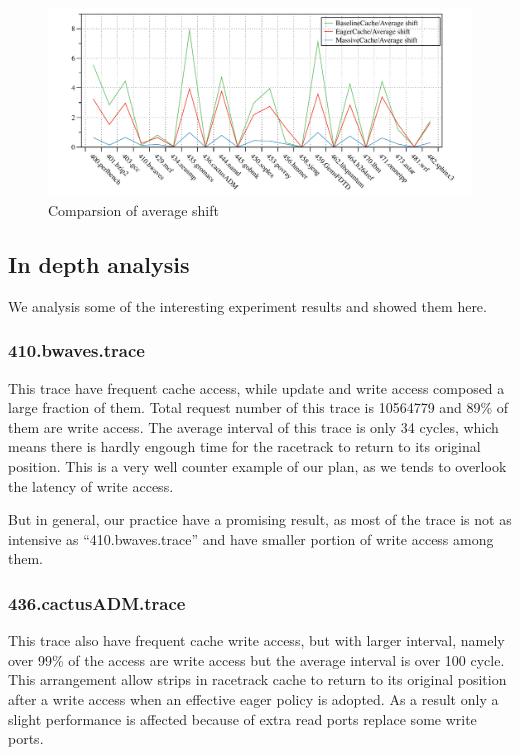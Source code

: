 \documentclass[11pt]{article}
\begin{document}
\begin{figure}
\centering
\includegraphics[width=400pt]{con2.pdf}
\caption{Comparsion of average shift}
\label{fig:con2}
\end{figure}

\subsection{In depth analysis}
We analysis some of the interesting experiment results and showed them here.

\subsubsection{410.bwaves.trace}

This trace have frequent cache access, while update and write access composed a large fraction of them. Total request number of this trace is 10564779 and 89\% of them are write access. The average interval of this trace is only 34 cycles, which means there is hardly engough time for the racetrack to return to its original position. This is a very well counter example of our plan, as we tends to overlook the latency of write access.

But in general, our practice have a promising result, as most of the trace is not as intensive as ``410.bwaves.trace'' and have smaller portion of write access among them.

\subsubsection{436.cactusADM.trace}
This trace also have frequent cache write access, but with larger interval, namely over 99\% of the access are write access but the average interval is over 100 cycle. This arrangement allow strips in racetrack cache to return to its original position after a write access when an effective eager policy is adopted. As a result only a slight performance is affected because of extra read ports replace some write ports.
\end{document}
